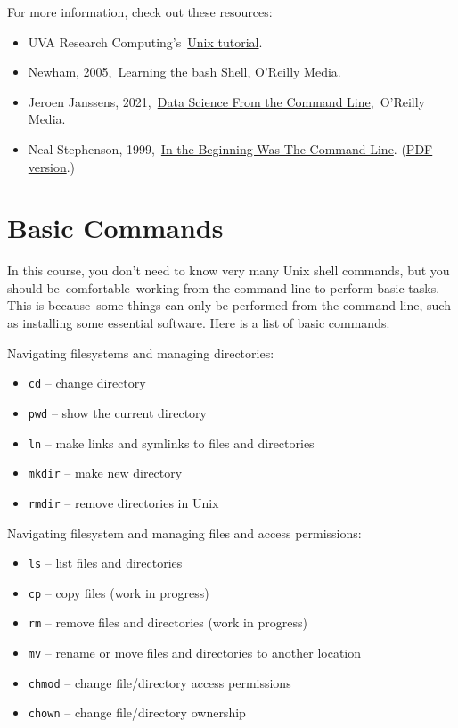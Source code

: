 \documentclass[
  letterpaper,
  DIV=11,
  numbers=noendperiod]{scrreport}
\providecommand{\tightlist}{%
  \setlength{\itemsep}{0pt}\setlength{\parskip}{0pt}}\usepackage{longtable,booktabs,array}
\begin{document}
For more information, check out these resources:

\begin{itemize}
\tightlist
\item
  UVA Research
  Computing's~\href{https://learning.rc.virginia.edu/notes/unix-tutorial/}{Unix
  tutorial}.
\item
  Newham,
  2005,~\href{https://learning.oreilly.com/library/view/learning-the-bash/0596009658/}{Learning
  the bash Shell}, O'Reilly Media.
\item
  Jeroen Janssens,
  2021,~\href{https://datascienceatthecommandline.com/2e/}{Data Science
  From the Command Line},~O'Reilly Media.
\item
  Neal Stephenson,
  1999,~\href{http://project.cyberpunk.ru/lib/in_the_beginning_was_the_command_line/}{In
  the Beginning Was The Command Line}.
  (\href{http://public-library.uk/ebooks/23/31.pdf}{PDF version}.)
\end{itemize}

\hypertarget{basic-commands}{%
\section{Basic Commands}\label{basic-commands}}

In this course, you don't need to know very many Unix shell commands,
but you should be~comfortable~working from the command line to perform
basic tasks. This is because~some things can only be performed from the
command line, such as installing some essential software. Here is a list
of basic commands.

Navigating filesystems and managing directories:

\begin{itemize}
\tightlist
\item
  \texttt{cd} -- change directory
\item
  \texttt{pwd} -- show the current directory
\item
  \texttt{ln} -- make links and symlinks to files and directories
\item
  \texttt{mkdir} -- make new directory
\item
  \texttt{rmdir} -- remove directories in Unix
\end{itemize}

Navigating filesystem and managing files and access permissions:

\begin{itemize}
\tightlist
\item
  \texttt{ls} -- list files and directories
\item
  \texttt{cp} -- copy files (work in progress)
\item
  \texttt{rm} -- remove files and directories (work in progress)
\item
  \texttt{mv} -- rename or move files and directories to another
  location
\item
  \texttt{chmod} -- change file/directory access permissions
\item
  \texttt{chown} -- change file/directory ownership
\end{itemize}
\end{document}
